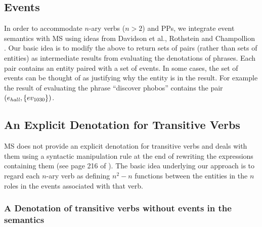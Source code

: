 \documentclass[../main.tex]{subfiles}
\begin{document}
\begin{refsection}
\subsection{Events}

In order to accommodate $n$-ary verbs ($n > 2$) and PPs, we integrate event semantics
with MS using ideas from Davidson et al.\cite{davidson2012semantics}, Rothstein \cite{rothstein2008structuring} and Champollion \cite{champollion2015interaction}.
Our basic idea is to modify the above to return sets of pairs (rather than sets of entities) as intermediate
results from evaluating the denotations of phrases. Each pair contains an entity paired with a set of
events. In some cases, the set of events can be thought of as justifying why the entity is in the result.
For example the result of evaluating the phrase ``discover phobos'' contains the pair $(e_{\mathit{hall}} , \{ev_{\mathrm{1030}}\})$.

\subsection{An Explicit Denotation for Transitive Verbs}

MS does not provide an explicit denotation for transitive verbs and deals with them using a syntactic
manipulation rule at the end of rewriting the expressions containing them (see page 216 of
\cite{Dowty:wall}).
The basic idea underlying our approach is to regard each $n$-ary verb as defining
$n^2 - n$ functions between the entities in the $n$ roles in the events associated with that verb.

\subsubsection{A Denotation of transitive verbs without events in the semantics}
\label{ext:transvbfdbr}


\end{refsection}
\end{document}
